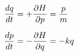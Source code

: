 \documentclass[preview]{standalone}
\begin{document}
\begin{align*}
\special{dvisvgm:raw <g id='unique000'>}\frac{dq}{dt} &= +\frac{\partial H}{\partial p} = \frac{p}{m} \\[6pt]\frac{dp}{dt} &= -\frac{\partial H}{\partial q} = -kq\special{dvisvgm:raw </g>}
\end{align*}
\end{document}
